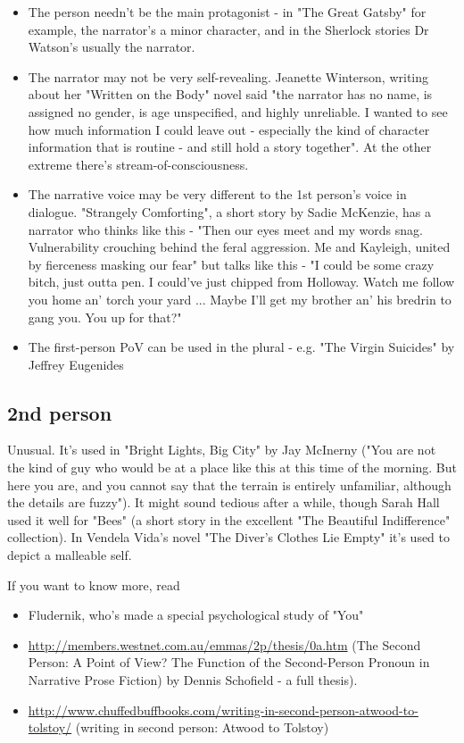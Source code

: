 \documentclass[11pt]{article}
\begin{document}
\begin{itemize}
\item The person needn't be the main protagonist - in "The Great Gatsby" for example, the narrator's a minor character, and in the Sherlock stories Dr Watson's usually the narrator. 
\item The narrator may not be very self-revealing. Jeanette Winterson, writing about her "Written on the Body" novel said "the narrator has no name, is assigned no gender, is age unspecified, and highly unreliable. I wanted to see how much information I could leave out - especially the kind of character information that is routine - and still hold a story together". At the other extreme there's stream-of-consciousness.
\item The narrative voice may be very different to the 1st person's voice in dialogue. "Strangely Comforting", a short story by Sadie McKenzie, has a narrator who thinks like this - "Then our eyes meet and my words snag. Vulnerability crouching behind the feral aggression. Me and Kayleigh, united by fierceness masking our fear" but talks like this - "I could be some crazy bitch, just outta pen. I could've just chipped from Holloway. Watch me follow you home an' torch your yard ... Maybe I'll get my brother an' his bredrin to gang you. You up for that?"


\item The first-person PoV can be used in the plural - e.g. "The Virgin Suicides" by Jeffrey Eugenides
\end{itemize}

\subsection*{2nd person} 
Unusual. It's used in "Bright Lights, Big City" by Jay McInerny ("You are not the kind of guy who would be at a place like this at this time of the morning. But here you are, and you cannot say that the terrain is entirely unfamiliar, although the details are fuzzy"). It might sound tedious after a while, though Sarah Hall used it well for "Bees" (a short story in the excellent "The Beautiful Indifference" collection). In Vendela Vida’s novel "The Diver’s Clothes Lie Empty" it's used to depict a malleable self.



If you want to know more, read 


\begin{itemize}
\item Fludernik, who's made a special psychological study of "You"
\item  \url{http://members.westnet.com.au/emmas/2p/thesis/0a.htm} (The Second Person: A Point of View? The Function of the Second-Person Pronoun in Narrative Prose Fiction) by Dennis Schofield - a full thesis).
\item \url{http://www.chuffedbuffbooks.com/writing-in-second-person-atwood-to-tolstoy/} (writing in second person: Atwood to Tolstoy)
\end{itemize}
\end{document}
